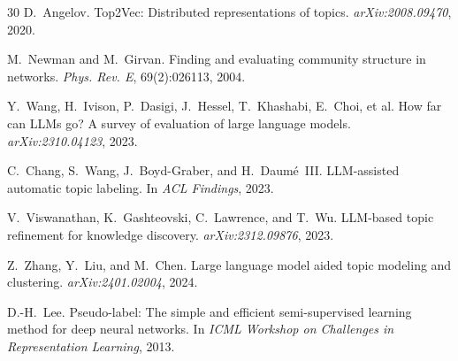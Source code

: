 \documentclass[10pt,twocolumn,twoside]{ctexart}
\begin{document}
\begin{thebibliography}{30}
D.~Angelov.
Top2Vec: Distributed representations of topics.
\textit{arXiv:2008.09470}, 2020.

M.~Newman and M.~Girvan.
Finding and evaluating community structure in networks.
\textit{Phys. Rev. E}, 69(2):026113, 2004.

Y.~Wang, H.~Ivison, P.~Dasigi, J.~Hessel, T.~Khashabi, E.~Choi, et al.
How far can LLMs go? A survey of evaluation of large language models.
\textit{arXiv:2310.04123}, 2023.

C.~Chang, S.~Wang, J.~Boyd-Graber, and H.~Daum\'{e}~III.
LLM-assisted automatic topic labeling.
In \textit{ACL Findings}, 2023.

V.~Viswanathan, K.~Gashteovski, C.~Lawrence, and T.~Wu.
LLM-based topic refinement for knowledge discovery.
\textit{arXiv:2312.09876}, 2023.

Z.~Zhang, Y.~Liu, and M.~Chen.
Large language model aided topic modeling and clustering.
\textit{arXiv:2401.02004}, 2024.

D.-H.~Lee.
Pseudo-label: The simple and efficient semi-supervised learning method for deep neural networks.
In \textit{ICML Workshop on Challenges in Representation Learning}, 2013.

\end{thebibliography}
\end{document}
